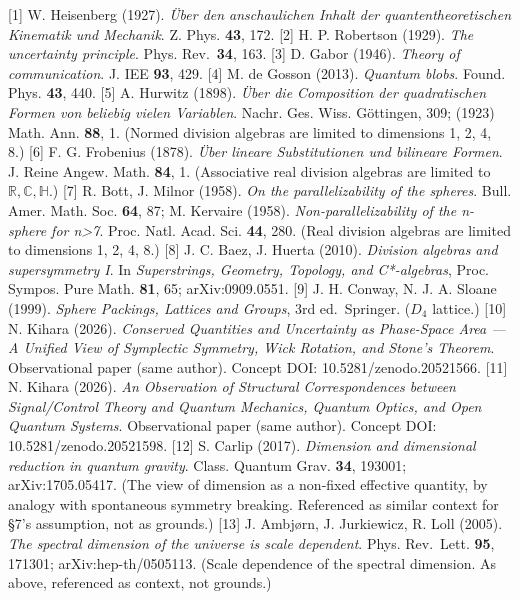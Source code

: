 \documentclass[
]{article}
\begin{document}
{[}1{]} W. Heisenberg (1927). \emph{Über den anschaulichen Inhalt der
quantentheoretischen Kinematik und Mechanik}. Z. Phys. \textbf{43}, 172.
{[}2{]} H. P. Robertson (1929). \emph{The uncertainty principle}. Phys.
Rev.~\textbf{34}, 163. {[}3{]} D. Gabor (1946). \emph{Theory of
communication}. J. IEE \textbf{93}, 429. {[}4{]} M. de Gosson (2013).
\emph{Quantum blobs}. Found. Phys. \textbf{43}, 440. {[}5{]} A. Hurwitz
(1898). \emph{Über die Composition der quadratischen Formen von beliebig
vielen Variablen}. Nachr. Ges. Wiss. Göttingen, 309; (1923) Math. Ann.
\textbf{88}, 1. (Normed division algebras are limited to dimensions 1,
2, 4, 8.) {[}6{]} F. G. Frobenius (1878). \emph{Über lineare
Substitutionen und bilineare Formen}. J. Reine Angew. Math. \textbf{84},
1. (Associative real division algebras are limited to
\(\mathbb{R},\mathbb{C},\mathbb{H}\).) {[}7{]} R. Bott, J. Milnor
(1958). \emph{On the parallelizability of the spheres}. Bull. Amer.
Math. Soc. \textbf{64}, 87; M. Kervaire (1958).
\emph{Non-parallelizability of the n-sphere for n\textgreater7}. Proc.
Natl. Acad. Sci. \textbf{44}, 280. (Real division algebras are limited
to dimensions 1, 2, 4, 8.) {[}8{]} J. C. Baez, J. Huerta (2010).
\emph{Division algebras and supersymmetry I}. In \emph{Superstrings,
Geometry, Topology, and C*-algebras}, Proc. Sympos. Pure Math.
\textbf{81}, 65; arXiv:0909.0551. {[}9{]} J. H. Conway, N. J. A. Sloane
(1999). \emph{Sphere Packings, Lattices and Groups}, 3rd ed.~Springer.
(\(D_4\) lattice.) {[}10{]} N. Kihara (2026). \emph{Conserved Quantities
and Uncertainty as Phase-Space Area --- A Unified View of Symplectic
Symmetry, Wick Rotation, and Stone's Theorem}. Observational paper (same
author). Concept DOI: 10.5281/zenodo.20521566. {[}11{]} N. Kihara
(2026). \emph{An Observation of Structural Correspondences between
Signal/Control Theory and Quantum Mechanics, Quantum Optics, and Open
Quantum Systems}. Observational paper (same author). Concept DOI:
10.5281/zenodo.20521598. {[}12{]} S. Carlip (2017). \emph{Dimension and
dimensional reduction in quantum gravity}. Class. Quantum Grav.
\textbf{34}, 193001; arXiv:1705.05417. (The view of dimension as a
non-fixed effective quantity, by analogy with spontaneous symmetry
breaking. Referenced as similar context for §7's assumption, not as
grounds.) {[}13{]} J. Ambjørn, J. Jurkiewicz, R. Loll (2005). \emph{The
spectral dimension of the universe is scale dependent}. Phys. Rev.~Lett.
\textbf{95}, 171301; arXiv:hep-th/0505113. (Scale dependence of the
spectral dimension. As above, referenced as context, not grounds.)
\end{document}
